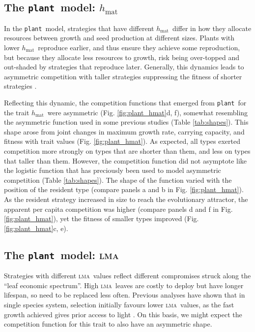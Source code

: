 \documentclass[a4paper,11pt]{article}
\newcommand{\plant}{{\tt plant}}
\newcommand{\hmat}{\ensuremath{h_{\text{mat}}}}
\newcommand{\lma}{\textsc{lma}}
\begin{document}
\subsection{The \plant\ model: \hmat}

In the \plant\ model, strategies that have different \hmat\ differ in how they allocate resources between growth and seed production at different sizes. Plants with lower \hmat\ reproduce earlier, and thus ensure they achieve some reproduction, but because they allocate less resources to growth, risk being over-topped and out-shaded by strategies that reproduce later. Generally, this dynamics leads to asymmetric competition with taller strategies suppressing the fitness of shorter strategies \cite{Falster-2017}.

Reflecting this dynamic, the competition functions that emerged from \plant\ for the trait \hmat\ were asymmetric (Fig. \ref{fig:plant_hmat}d, f), somewhat resembling the asymmetric function used in some previous studies \citep{Law-1997, Kisdi-1999, Geritz-1999, Egas-2004, Calcagno-2006, DAndrea-2013} (Table \ref{tab:shapes}). This shape arose from joint changes in maximum growth rate, carrying capacity, and fitness with trait values (Fig. \ref{fig:plant_hmat}). As expected, all types exerted competition more strongly on types that are shorter than them, and less on types that taller than them. However, the competition function did not asymptote like the logistic function that has preciously been used to model asymmetric competition (Table \ref{tab:shapes}). The shape of the function varied with the position of the resident type (compare panels a and b in Fig. \ref{fig:plant_hmat}). As the resident strategy increased in size to reach the evolutionary attractor, the apparent per capita competition was higher (compare panels d and f in Fig. \ref{fig:plant_hmat}), yet the fitness of smaller types improved (Fig. \ref{fig:plant_hmat}c, e).

\subsection{The \plant\ model: \lma}

Strategies with different \lma\ values reflect different compromises struck along the ``leaf economic spectrum''\citep{Reich-1997,Wright-2004}. High \lma\ leaves are costly to deploy but have longer lifespan, so need to be replaced less often. Previous analyses have shown that in single species system, selection initially favours lower \lma\ values, as the fast growth achieved gives prior access to light \citep{Falster-2017}. On this basis, we might expect the competition function for this trait to also have an asymmetric shape.
\end{document}
